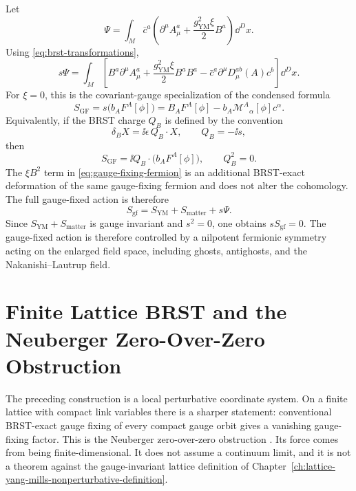 Let
\[
  \Psi
  =
  \int_M
  \bar c^a\left(
    \partial^\mu A_\mu^a+\frac{g_{\mathrm{YM}}^2\xi}{2}B^a
  \right)\dd^D x .
\]
Using \eqref{eq:brst-transformations},
\begin{equation}
  s\Psi
  =
  \int_M
  \left[
  B^a\partial^\mu A_\mu^a
  +\frac{g_{\mathrm{YM}}^2\xi}{2}B^aB^a
  -\bar c^a\partial^\mu D_\mu^{ab}(A)c^b
  \right]\dd^D x .
  \label{eq:gauge-fixing-fermion}
\end{equation}
For \(\xi=0\), this is the covariant-gauge specialization of the condensed
formula
\[
  S_{\mathrm{GF}}
  =
  s\bigl(b_AF^A[\phi]\bigr)
  =
  B_AF^A[\phi]-b_A\mathcal M^A{}_\alpha[\phi]c^\alpha .
\]
Equivalently, if the BRST charge \(Q_B\) is defined by the convention
\begin{equation}
  \delta_B X=\ii\epsilon\,Q_B\cdot X,
  \qquad
  Q_B=-\ii s,
  \label{eq:qb-convention-from-s}
\end{equation}
then
\begin{equation}
  S_{\mathrm{GF}}
  =
  \ii Q_B\cdot\bigl(b_AF^A[\phi]\bigr),
  \qquad
  Q_B^2=0 .
  \label{eq:b-notation-gauge-fixing-qb-exact}
\end{equation}
The \(\xi B^2\) term in \eqref{eq:gauge-fixing-fermion} is an additional
BRST-exact deformation of the same gauge-fixing fermion and does not alter the
cohomology.
The full gauge-fixed action is therefore
\[
  S_{\mathrm{gf}}
  =
  S_{\mathrm{YM}}+S_{\mathrm{matter}}+s\Psi .
\]
Since \(S_{\mathrm{YM}}+S_{\mathrm{matter}}\) is gauge invariant and \(s^2=0\),
one obtains \(sS_{\mathrm{gf}}=0\).  The gauge-fixed action is therefore
controlled by a nilpotent fermionic symmetry acting on the enlarged field
space, including ghosts, antighosts, and the Nakanishi--Lautrup field.

\section{Finite Lattice BRST and the Neuberger Zero-Over-Zero Obstruction}
\label{sec:lattice-brst-neuberger-obstruction}

The preceding construction is a local perturbative coordinate system.  On a
finite lattice with compact link variables there is a sharper statement:
conventional BRST-exact gauge fixing of every compact gauge orbit gives a
vanishing gauge-fixing factor.  This is the Neuberger zero-over-zero
obstruction \cite{Neuberger1986NonperturbativeBRS,
Neuberger1987BRSGribov}.  Its force comes from being finite-dimensional.  It
does not assume a continuum limit, and it is not a theorem against the
gauge-invariant lattice definition of
Chapter~\ref{ch:lattice-yang-mills-nonperturbative-definition}.

